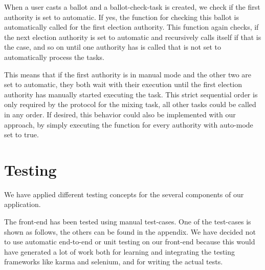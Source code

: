 When a user casts a ballot and a ballot-check-task is created, we check if the first authority is set to automatic. If yes, the function for checking this ballot is automatically called for the first election authority. This function again checks, if the next election authority is set to automatic and recursively calls itself if that is the case, and so on until one authority has is called that is not set to automatically process the tasks.

This means that if the first authority is in manual mode and the other two are set to automatic, they both wait with their execution until the first election authority has manually started executing the task. This strict sequential order is only required by the protocol for the mixing task, all other tasks could be called in any order. If desired, this behavior could also be implemented with our approach, by simply executing the function for every authority with auto-mode set to true.

\section{Testing}
We have applied different testing concepts for the several components of our application.

The front-end has been tested using manual test-cases. One of the test-cases is shown as follows, the others can be found in the appendix. We have decided not to use automatic end-to-end or unit testing on our front-end because this would have generated a lot of work both for learning and integrating the testing frameworks like karma and selenium, and for writing the actual tests.

